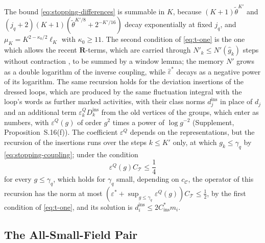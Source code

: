 \documentclass[11pt]{preprint}
\numberwithin{equation}{section}
\theoremstyle{definition}
\theoremstyle{remark}
\theoremstyle{plain}
\begin{document}
The bound \eqref{eq:stopping-differences} is summable in $K$, because $(K + 1)\tilde\theta^{K'}$ and $(j_q + 2)(K + 1)(\tilde\theta^{K'/8} + 2^{-K'/16})$ decay exponentially at fixed $j_q$, and $\mu_K = K^{2-\kappa_0/2}\ell_K$ with $\kappa_0 \geq 11$. The second condition of \eqref{eq:t-one} is the one which allows the recent $\mathbf R$-terms, which are carried through $N'_k \leq N'(\hat g_k)$ steps without contraction \cite[pp.~270--271]{BalabanCRE}, to be summed by a window lemma; the memory $N'$ grows as a double logarithm of the inverse coupling, while $\hat\varepsilon^*$ decays as a negative power of its logarithm. The same recursion holds for the deviation insertions of the dressed loops, which are produced by the same fluctuation integral with the loop's words as further marked activities, with their class norms $d^{\mathrm{ins}}_j$ in place of $d_j$ and an additional term $\varepsilon^Q_kD^{\mathrm{ins}}_k$ from the old vertices of the groups, which enter as numbers, with $\varepsilon^Q(g)$ of order $g^2$ times a power of $\log g^{-2}$ (Supplement, Proposition~S.16(f)). The coefficient $\varepsilon^Q$ depends on the representations, but the recursion of the insertions runs over the steps $k \leq K'$ only, at which $g_k \leq \gamma_q$ by \eqref{eq:stopping-coupling}; under the condition
\begin{equation}\label{eq:insertion-recursion-condition}
    \varepsilon^Q(g)C_{\mathcal T} \leq \frac14
\end{equation}
for every $g \leq \gamma_q$, which holds for $\gamma_q$ small, depending on $c_{\mathcal C}$, the operator of this recursion has the norm at most $(\varepsilon^* + \sup_{g \leq \gamma_q}\varepsilon^Q(g))C_{\mathcal T} \leq \frac12$, by the first condition of \eqref{eq:t-one}, and its solution is $d^{\mathrm{ins}}_i \leq 2C^*_{\mathrm{ins}}m_i$.

\subsection{The All-Small-Field Pair}\label{sec:trivial-pair}
\end{document}
